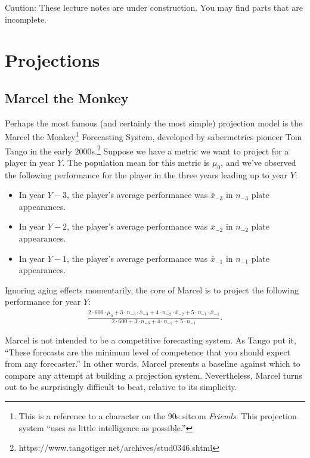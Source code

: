 \documentclass{article}
\begin{document}
\begin{framed}
  {\sc Caution:} These lecture notes are under construction. You may find parts that are incomplete.
\end{framed}

\setcounter{section}{6}
\section{\sc Projections}

  \subsection{\sc Marcel the Monkey}

    Perhaps the most famous (and certainly the most simple) projection model is the Marcel the Monkey\footnote{This is a reference to a character on the 90s sitcom {\it Friends}. This projection system ``uses as little intelligence as possible.''} Forecasting System, developed by sabermetrics pioneer Tom Tango in the early 2000s.\footnote{https://www.tangotiger.net/archives/stud0346.shtml} Suppose we have a metric we want to project for a player in year $Y$. The population mean for this metric is $\mu_0$, and we've observed the following performance for the player in the three years leading up to year $Y$:
    \begin{itemize}
      \item In year $Y - 3$, the player's average performance was $\bar x_{-3}$ in $n_{-3}$ plate appearances.
      \item In year $Y - 2$, the player's average performance was $\bar x_{-2}$ in $n_{-2}$ plate appearances.
      \item In year $Y - 1$, the player's average performance was $\bar x_{-1}$ in $n_{-1}$ plate appearances.
    \end{itemize}

    Ignoring aging effects momentarily, the core of Marcel is to project the following performance for year $Y$:
    \begin{align}
      \label{eqn:marcel}
      \frac
        {2 \cdot 600 \cdot \mu_0 + 3 \cdot n_{-3} \cdot \bar x_{-3} + 4 \cdot n_{-2} \cdot \bar x_{-2} + 5 \cdot n_{-1} \cdot \bar x_{-1}}
        {2 \cdot 600 + 3 \cdot n_{-3} + 4 \cdot n_{-2} + 5 \cdot n_{-1}}.
    \end{align}

    Marcel is not intended to be a competitive forecasting system. As Tango put it, ``These forecasts are the minimum level of competence that you should expect from any forecaster.'' In other words, Marcel presents a baseline against which to compare any attempt at building a projection system. Nevertheless, Marcel turns out to be surprisingly difficult to beat, relative to its simplicity.
\end{document}
